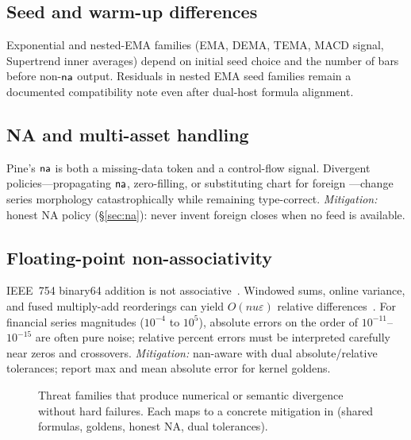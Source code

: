 \documentclass[11pt,a4paper]{article}
\begin{document}
\subsection{Seed and warm-up differences}
Exponential and nested-EMA families (EMA, DEMA, TEMA, MACD signal, Supertrend
inner averages) depend on initial seed choice and the number of bars before
non-$\textsf{na}$ output.
Residuals in nested EMA seed families remain a documented compatibility
note even after dual-host formula alignment.

\subsection{NA and multi-asset handling}
Pine's $\textsf{na}$ is both a missing-data token and a control-flow signal.
Divergent policies---propagating $\textsf{na}$, zero-filling, or substituting chart
 for foreign ---change series morphology
catastrophically while remaining type-correct.
\emph{Mitigation:} honest NA policy (\S\ref{sec:na}): never invent foreign
closes when no feed is available.

\subsection{Floating-point non-associativity}
IEEE~754 binary64 addition is not associative~\citep{ieee754}.
Windowed sums, online variance, and fused multiply-add reorderings can yield
$O(nu\varepsilon)$ relative differences~\citep{higham2002accuracy}.
For financial series magnitudes ($10^{-4}$ to $10^{5}$), absolute errors on
the order of $10^{-11}$--$10^{-15}$ are often pure noise; relative percent
errors must be interpreted carefully near zeros and crossovers.
\emph{Mitigation:} nan-aware  with dual absolute/relative
tolerances; report max and mean absolute error for kernel goldens.

\begin{figure}[t]
\centering
{}
\caption{Threat families that produce numerical or semantic divergence without
hard failures. Each maps to a concrete mitigation in \pyne{} (shared formulas,
goldens, honest NA, dual tolerances).}
\label{fig:threats}
\end{figure}
\end{document}
